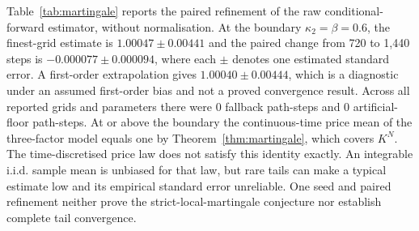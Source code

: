 \begin{table}
\label{tab:martingale}
\end{table}

Table~\ref{tab:martingale} reports the paired refinement of the raw conditional-forward estimator, without normalisation. At the boundary $\kappa_2=\beta=0.6$, the finest-grid estimate is $1.00047\pm0.00441$ and the paired change from 720 to 1,440 steps is $-0.000077\pm0.000094$, where each $\pm$ denotes one estimated standard error. A first-order extrapolation gives $1.00040\pm0.00444$, which is a diagnostic under an assumed first-order bias and not a proved convergence result. Across all reported grids and parameters there were 0 fallback path-steps and 0 artificial-floor path-steps. At or above the boundary the continuous-time price mean of the three-factor model equals one by Theorem~\ref{thm:martingale}, which covers $K^N$. The time-discretised price law does not satisfy this identity exactly. An integrable i.i.d. sample mean is unbiased for that law, but rare tails can make a typical estimate low and its empirical standard error unreliable. One seed and paired refinement neither prove the strict-local-martingale conjecture nor establish complete tail convergence.

